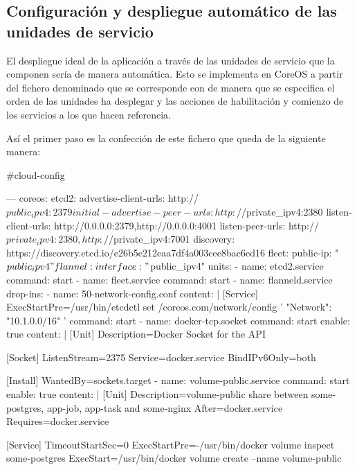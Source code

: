 \subsection{Configuración y despliegue automático de las unidades de servicio}

El despliegue ideal de la aplicación a través de las unidades de servicio que la componen sería de manera automática. Esto se implementa en CoreOS a partir del fichero denominado  que se corresponde con  de manera que se especifica el orden de las unidades ha desplegar y las acciones de habilitación y comienzo de los servicios a los que hacen referencia.

Así el primer paso es la confección de este fichero que queda de la siguiente manera:

\begin{codelisting}
\label{code:vagrantfile2}
\begin{code}
#cloud-config

---
coreos:
  etcd2:
    advertise-client-urls: http://$public_ipv4:2379
    initial-advertise-peer-urls: http://$private_ipv4:2380
    listen-client-urls: http://0.0.0.0:2379,http://0.0.0.0:4001
    listen-peer-urls: http://$private_ipv4:2380,http://$private_ipv4:7001
    discovery: https://discovery.etcd.io/e26b5e212eaa7df4a003cee8bac6ed16
  fleet:
    public-ip: "$public_ipv4"
  flannel:
    interface: "$public_ipv4"
  units:
  - name: etcd2.service
    command: start
  - name: fleet.service
    command: start
  - name: flanneld.service
    drop-ins:
    - name: 50-network-config.conf
      content: |
        [Service]
        ExecStartPre=/usr/bin/etcdctl set /coreos.com/network/config 
                     '{ "Network": "10.1.0.0/16" }'
    command: start
  - name: docker-tcp.socket
    command: start
    enable: true
    content: |
      [Unit]
      Description=Docker Socket for the API

      [Socket]
      ListenStream=2375
      Service=docker.service
      BindIPv6Only=both

      [Install]
      WantedBy=sockets.target
  - name: volume-public.service
    command: start
    enable: true
    content: |
      [Unit] 
      Description=volume-public share between some-postgres, app-job, app-task
                   and some-nginx 
      After=docker.service
      Requires=docker.service

      [Service] 
      TimeoutStartSec=0 
      ExecStartPre=-/usr/bin/docker volume inspect some-postgres
      ExecStart=/usr/bin/docker volume create --name volume-public


\end{code}
\end{codelisting}

